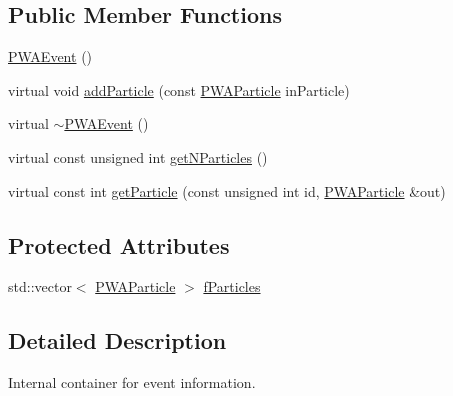 \subsection*{Public Member Functions}
\begin{DoxyCompactItemize}
\item 
\hyperlink{classPWAEvent_ad3c985fe0c67d2294ff58b99fb06a043}{PWAEvent} ()
\item 
virtual void \hyperlink{classPWAEvent_add408049d857264e539ea1d00b972240}{addParticle} (const \hyperlink{classPWAParticle}{PWAParticle} inParticle)
\item 
virtual \hyperlink{classPWAEvent_aab57677dff41575f0a806b42003eaff9}{$\sim$PWAEvent} ()
\item 
virtual const unsigned int \hyperlink{classPWAEvent_a49b9731f3e38c7535c14bb0df3b032fc}{getNParticles} ()
\item 
virtual const int \hyperlink{classPWAEvent_aa38bc07dfd5d8df80624d50720bffa18}{getParticle} (const unsigned int id, \hyperlink{classPWAParticle}{PWAParticle} \&out)
\end{DoxyCompactItemize}
\subsection*{Protected Attributes}
\begin{DoxyCompactItemize}
\item 
std::vector$<$ \hyperlink{classPWAParticle}{PWAParticle} $>$ \hyperlink{classPWAEvent_aac928bac7991d55225c0219c4c9ddf7a}{fParticles}
\end{DoxyCompactItemize}


\subsection{Detailed Description}
Internal container for event information. 

